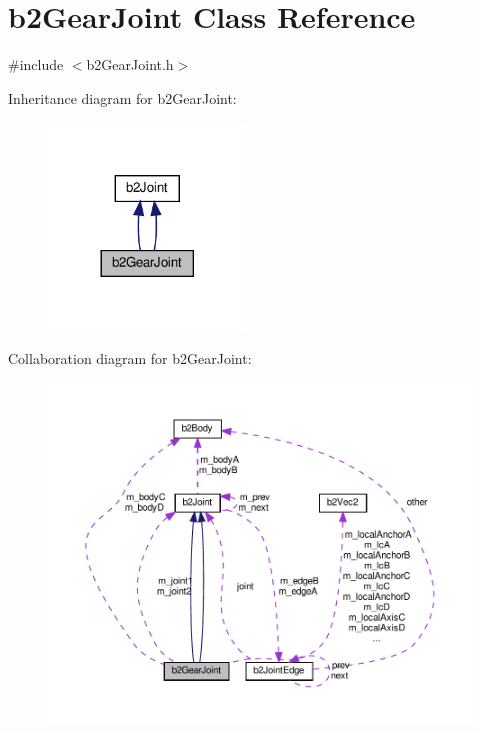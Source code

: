 \hypertarget{classb2GearJoint}{}\section{b2\+Gear\+Joint Class Reference}
\label{classb2GearJoint}


{\ttfamily \#include $<$b2\+Gear\+Joint.\+h$>$}



Inheritance diagram for b2\+Gear\+Joint\+:
\nopagebreak
\begin{figure}[H]
\begin{center}
\leavevmode
\includegraphics[width=149pt]{classb2GearJoint__inherit__graph}
\end{center}
\end{figure}


Collaboration diagram for b2\+Gear\+Joint\+:
\nopagebreak
\begin{figure}[H]
\begin{center}
\leavevmode
\includegraphics[width=350pt]{classb2GearJoint__coll__graph}
\end{center}
\end{figure}
